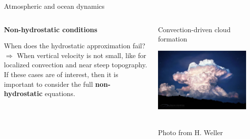 \documentclass[aspectratio=169,xcolor=dvipsnames]{beamer}
\newcommand\credit[2]{
        \\ \vspace{-0.5em}
        {\color{gray}\scriptsize
        \hfill
        #1
        \hspace{#2}}
        }
\begin{document}
\begin{frame}[t]{Atmospheric and ocean dynamics}

\begin{columns}
    \begin{column}[t]{0.6\textwidth}
        \begin{center}
        \textbf{{\large
        Non-hydrostatic conditions
        }}
        \end{center}
        
        \vspace{1.5em}
        
        When does the hydrostatic approximation fail?
        \\[1em]
        $\Longrightarrow$ When vertical velocity is not small, like for localized convection and near steep topography. 
        \newline
        \newline
        If these cases are of interest, then it is important to consider the full \textbf{non-hydrostatic} equations.
    \end{column}
    \begin{column}[t]{0.4\textwidth}
        \centering

        \vspace{1em}

        {\footnotesize
        Convection-driven cloud formation
        }
        
        \vspace{0.5em}
        
        \includegraphics[width=0.95\textwidth]{figs/Fig-convectionCloud-HWeller-Pic-1-768x514.jpeg}
        \credit{Photo from H. Weller}{5pt}
    \end{column}
\end{columns}
        
\end{frame}
\end{document}
